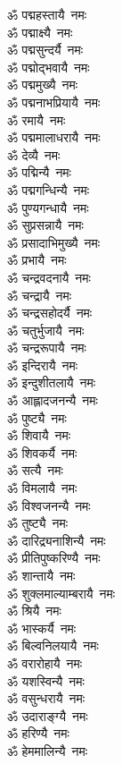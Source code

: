 \begin{multicols}{2}
\begin{flushleft}
ॐ पद्महस्तायै~नमः\\
ॐ पद्माक्ष्यै~नमः\\
ॐ पद्मसुन्दर्यै~नमः\\
ॐ पद्मोद्भवायै~नमः\\
ॐ पद्ममुख्यै~नमः\\
ॐ पद्मनाभप्रियायै~नमः\\
ॐ रमायै~नमः\\
ॐ पद्ममालाधरायै~नमः\\
ॐ देव्यै~नमः\\
ॐ पद्मिन्यै~नमः\hfill{}\\
ॐ पद्मगन्धिन्यै~नमः\\
ॐ पुण्यगन्धायै~नमः\\
ॐ सुप्रसन्नायै~नमः\\
ॐ प्रसादाभिमुख्यै~नमः\\
ॐ प्रभायै~नमः\\
ॐ चन्द्रवदनायै~नमः\\
ॐ चन्द्रायै~नमः\\
ॐ चन्द्रसहोदर्यै~नमः\\
ॐ चतुर्भुजायै~नमः\\
ॐ चन्द्ररूपायै~नमः\hfill{}\\
ॐ इन्दिरायै~नमः\\
ॐ इन्दुशीतलायै~नमः\\
ॐ आह्लादजनन्यै~नमः\\
ॐ पुष्ट्यै~नमः\\
ॐ शिवायै~नमः\\
ॐ शिवकर्यै~नमः\\
ॐ सत्यै~नमः\\
ॐ विमलायै~नमः\\
ॐ विश्वजनन्यै~नमः\\
ॐ तुष्ट्यै~नमः\hfill{}\\
ॐ दारिद्र्यनाशिन्यै~नमः\\
ॐ प्रीतिपुष्करिण्यै~नमः\\
ॐ शान्तायै~नमः\\
ॐ शुक्लमाल्याम्बरायै~नमः\\
ॐ श्रियै~नमः\\
ॐ भास्कर्यै~नमः\\
ॐ बिल्वनिलयायै~नमः\\
ॐ वरारोहायै~नमः\\
ॐ यशस्विन्यै~नमः\\
ॐ वसुन्धरायै~नमः\hfill{}\\
ॐ उदाराङ्ग्यै~नमः\\
ॐ हरिण्यै~नमः\\
ॐ हेममालिन्यै~नमः\\

\end{flushleft}
\end{multicols}

